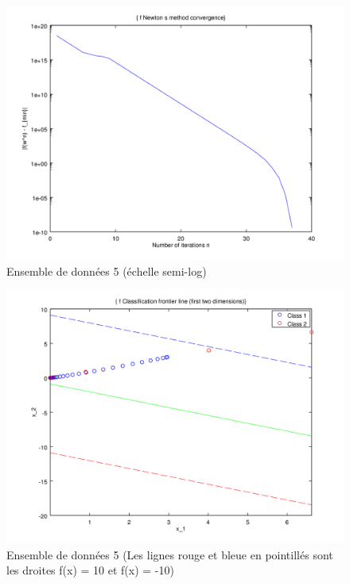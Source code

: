\documentclass{article}
\begin{document}
         \begin{figure}[H]
           \begin{center}
             \includegraphics[scale=0.5]{images/cvnewton5.png}
             \caption{Ensemble de données 5 (échelle semi-log)}
           \end{center}
         \end{figure}

         \begin{figure}[H]
           \begin{center}
             \includegraphics[scale=0.5]{images/line5.png}
             \caption{Ensemble de données 5 (Les lignes rouge et bleue en pointillés sont les droites f(x) = 10 et f(x) = -10)}
           \end{center}
         \end{figure}
\end{document}
